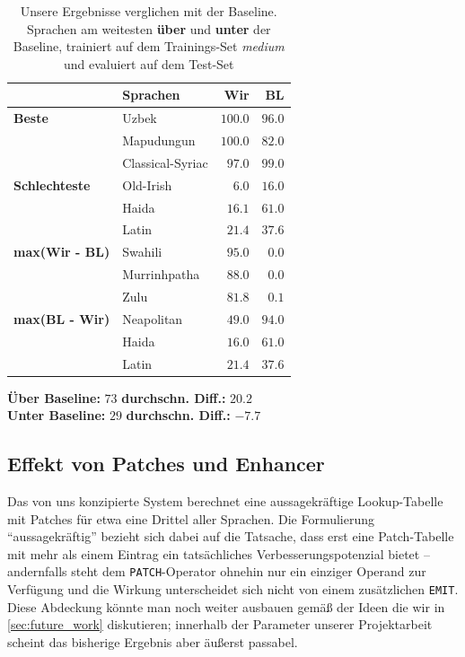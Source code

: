 \documentclass[11pt,a4paper]{article}
\newcommand{\action}[1]{\texttt{#1}}
\begin{document}
\begin{table}
\centering
\small
\begin{tabular}{llrr}
  \toprule
                           & \textbf{Sprachen}  &\textbf{Wir} & \textbf{BL} \\
\midrule\textbf{Beste}   & Uzbek              & $100.0$      & $96.0$ \\
                           & Mapudungun         & $100.0$      & $82.0$ \\
                           & Classical-Syriac   & $97.0$       & $99.0$ \\
\textbf{Schlechteste}         & Old-Irish          & $6.0$        & $16.0$ \\
                           & Haida              & $16.1$       & $61.0$ \\
                           & Latin              & $21.4$       & $37.6$ \\
\midrule
\textbf{max(Wir - BL)}    & Swahili            & $95.0$         & $0.0$ \\
                           & Murrinhpatha       & $88.0$       & $0.0$ \\
                           & Zulu               & $81.8$       & $0.1$ \\
\textbf{max(BL - Wir)}    & Neapolitan         & $49.0$       & $94.0$ \\
                           & Haida              & $16.0$       & $61.0$ \\
                           & Latin              & $21.4$       & $37.6$ \\
\bottomrule
\end{tabular}

\vspace{1ex}
\textbf{Über Baseline:} $73$  \quad \textbf{durchschn. Diff.:} $20.2$\\
\textbf{Unter Baseline:} $29$ \quad \textbf{durchschn. Diff.:} $-7.7$
\caption{Unsere Ergebnisse verglichen mit der Baseline. Sprachen am weitesten \textbf{über} und \textbf{unter} der Baseline, trainiert auf dem Trainings-Set \textit{medium} und evaluiert auf dem Test-Set}
\label{tab:langs_baseline}
\end{table}


\subsection{Effekt von Patches und Enhancer}
Das von uns konzipierte System berechnet eine aussagekräftige Lookup-Tabelle mit Patches für etwa eine Drittel aller Sprachen. Die Formulierung \enquote{aussagekräftig} bezieht sich dabei auf die Tatsache, dass erst eine Patch-Tabelle mit mehr als einem Eintrag ein tatsächliches Verbesserungspotenzial bietet -- andernfalls steht dem \action{PATCH}-Operator ohnehin nur ein einziger Operand zur Verfügung und die Wirkung unterscheidet sich nicht von einem zusätzlichen \action{EMIT}. Diese Abdeckung könnte man noch weiter ausbauen gemäß der Ideen die wir in \autoref{sec:future_work} diskutieren; innerhalb der Parameter unserer Projektarbeit scheint das bisherige Ergebnis aber äußerst passabel.
\end{document}
